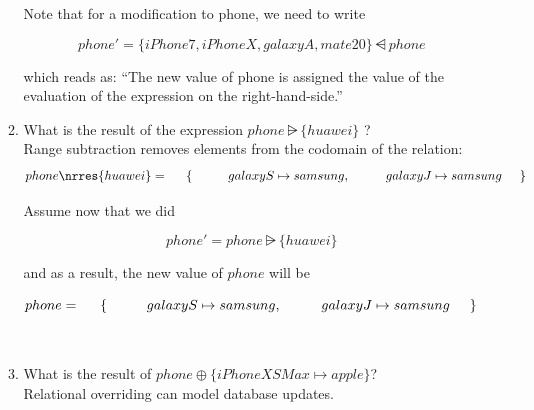 \documentclass[12pt]{article}
\begin{document}
\begin{enumerate}
\begin{enumerate}
\[\]

\noindent Note that for a modification to phone, we need to write


\[ phone' = \{ iPhone7, iPhoneX, galaxyA,mate20  \} \ndres phone \]


\noindent which reads as: ``The new value of phone is assigned the value of the evaluation of
the expression on the right-hand-side.''



\item What is the result of the expression  $phone \nrres \{ huawei \}$ ?\\


\noindent  Range subtraction removes elements from the codomain of the relation:\\


\[
phone \nrres \{ huawei\} = \\

\hspace{5mm} \{ \\
\hspace{10mm} galaxyS \mapsto samsung,\\
\hspace{10mm} galaxyJ \mapsto samsung\\
\hspace{5mm} \}

\]


\noindent Assume now that we did

\[ phone' = phone \nrres \{ huawei\} \]


\noindent and as a result, the new value of $phone$ will be

\[
phone = \\

\hspace{5mm} \{ \\
\hspace{10mm} galaxyS \mapsto samsung,\\
\hspace{10mm} galaxyJ \mapsto samsung\\
\hspace{5mm} \}

\]


\ \\


\item What is the result of $phone \oplus \{ iPhoneXSMax \mapsto apple \}$? \\


\noindent Relational overriding can model database updates.


\end{enumerate}
\end{enumerate}
\end{document}
